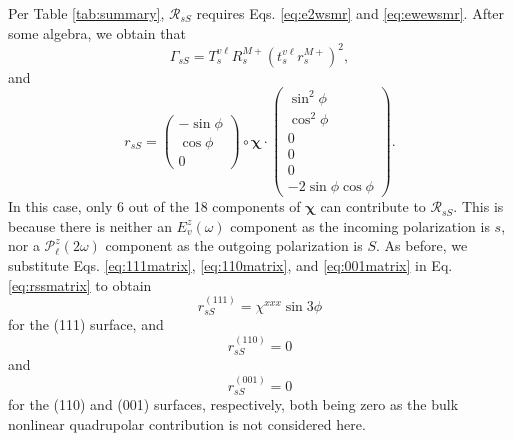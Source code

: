 \documentclass[aps,prb,10pt,showpacs,letterpaper,twocolumn]{revtex4-1}
\begin{document}
Per Table \ref{tab:summary}, $\mathcal{R}_{sS}$ requires Eqs. \eqref{eq:e2wsmr}
and \eqref{eq:ewewsmr}. After some algebra, we obtain that
\begin{equation}
\Gamma_{sS} = 
T_{s}^{v\ell}R^{M+}_{s}\left(t^{v\ell}_{s}r^{M+}_{s}\right)^{2},
\end{equation}
and
{\color{red}
\begin{equation}\label{eq:rssmatrix}
r_{sS}=
\begin{pmatrix}
-\sin\phi\\
\cos\phi\\
0
\end{pmatrix}
\circ
\boldsymbol{\chi}
\cdot
\begin{pmatrix}
\sin^{2}\phi\\
\cos^{2}\phi\\
0\\
0\\
0\\
- 2\sin\phi\cos\phi
\end{pmatrix}
.
\end{equation}
In this case, only 6 out of the 18 components of $\boldsymbol{\chi}$ can
contribute to $\mathcal{R}_{sS}$. This is because there is neither an
$E^{z}_v(\omega)$ component as the incoming polarization is $s$, nor a
$\mathcal{P}^{z}_\ell(2\omega)$ component as the outgoing polarization is $S$.
As before, we substitute Eqs. \eqref{eq:111matrix}, \eqref{eq:110matrix}, and
\eqref{eq:001matrix} in Eq. \eqref{eq:rssmatrix} to obtain
}
\begin{equation}\label{eq:rss111}
r^{(111)}_{sS} = \chi^{xxx}\sin3\phi
\end{equation}
for the (111) surface, and 
\begin{equation}\label{eq:rss110}
r^{(110)}_{sS} = 0
\end{equation}
and
\begin{equation}\label{eq:rss001}
r^{(001)}_{sS} = 0
\end{equation}
for the (110) and (001) surfaces, respectively, both being zero as the bulk
nonlinear quadrupolar contribution is not considered here.\cite{sipePRB87}
\end{document}
